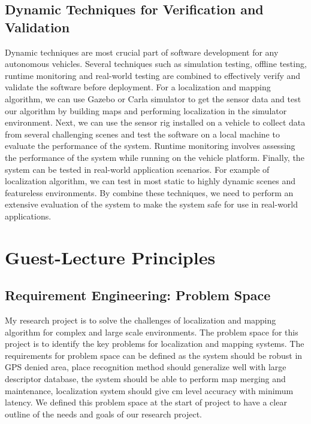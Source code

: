 \documentclass{article}
\begin{document}
\subsection{Dynamic Techniques for Verification and Validation}

Dynamic techniques are most crucial part of software development for any autonomous vehicles. Several techniques such as simulation testing, offline testing, runtime monitoring and real-world testing are combined to effectively verify and validate the software before deployment. For a localization and mapping algorithm, we can use Gazebo or Carla simulator to get the sensor data and test our algorithm by building maps and performing localization in  the simulator environment. Next, we can use the sensor rig installed on a vehicle to collect data from several challenging scenes and test the software on a local machine to evaluate the performance of the system. Runtime monitoring involves assessing the performance of the system while running on the vehicle platform. Finally, the system can be tested in real-world application scenarios. For example of localization algorithm, we can test in most static to highly dynamic scenes and featureless environments. By combine these techniques, we need to perform an extensive evaluation of the system to make the system safe for use in real-world applications.


\section{Guest-Lecture Principles}


\subsection{Requirement Engineering: Problem Space}

My research project is to solve the challenges of localization and mapping algorithm for complex and large scale environments. The problem space for this project is to identify the key problems for localization and mapping systems. The requirements for problem space can be defined as the system should be robust in GPS denied area, place recognition method should generalize well with large descriptor database, the system should be able to perform map merging and maintenance, localization system should give cm level accuracy with minimum latency. We defined this problem space at the start of project to have a clear outline of the needs and goals of our research project.
\end{document}
